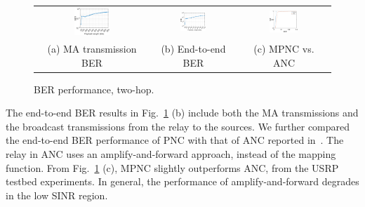 \begin{figure}
\centering
\begin{tabular}{ccc}
    \includegraphics[width=0.33\textwidth]{figures/BER_Payload_MA.eps} &
    \includegraphics[width=0.33\textwidth]{figures/BER_Payload_e2e.eps}&
     \includegraphics[width=0.33\textwidth]{figures/cdf}\\
      (a) MA  transmission BER &    (b) End-to-end BER & (c) MPNC vs. ANC
      \end{tabular}
       \caption{BER performance, two-hop.}
    \label{fig:e2e_ber}
\end{figure}
%                         


The end-to-end BER results in Fig.~\ref{fig:e2e_ber} (b) include both the MA transmissions and the broadcast transmissions from the relay to the sources. We further compared the end-to-end BER performance of PNC with that of ANC reported in~\cite{katti2007embracing}. The relay in ANC uses an amplify-and-forward approach, instead of the mapping function. From Fig.~\ref{fig:e2e_ber} (c),  MPNC slightly outperforms ANC, from the USRP testbed experiments. In general, the performance of amplify-and-forward degrades in the low SINR region. 

